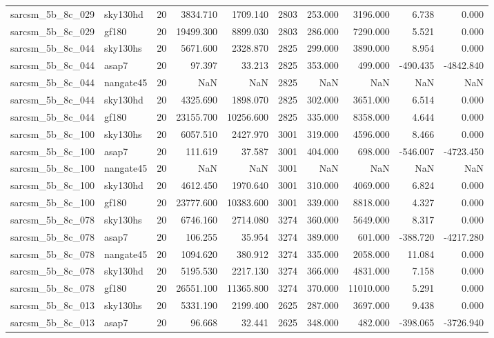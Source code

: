 \begin{longtable}{llrrrrrrrr}
sarcsm\_5b\_8c\_029 & sky130hd & 20 & 3834.710 & 1709.140 & 2803 & 253.000 & 3196.000 & 6.738 & 0.000 \\
sarcsm\_5b\_8c\_029 & gf180 & 20 & 19499.300 & 8899.030 & 2803 & 286.000 & 7290.000 & 5.521 & 0.000 \\
sarcsm\_5b\_8c\_044 & sky130hs & 20 & 5671.600 & 2328.870 & 2825 & 299.000 & 3890.000 & 8.954 & 0.000 \\
sarcsm\_5b\_8c\_044 & asap7 & 20 & 97.397 & 33.213 & 2825 & 353.000 & 499.000 & -490.435 & -4842.840 \\
sarcsm\_5b\_8c\_044 & nangate45 & 20 & NaN & NaN & 2825 & NaN & NaN & NaN & NaN \\
sarcsm\_5b\_8c\_044 & sky130hd & 20 & 4325.690 & 1898.070 & 2825 & 302.000 & 3651.000 & 6.514 & 0.000 \\
sarcsm\_5b\_8c\_044 & gf180 & 20 & 23155.700 & 10256.600 & 2825 & 335.000 & 8358.000 & 4.644 & 0.000 \\
sarcsm\_5b\_8c\_100 & sky130hs & 20 & 6057.510 & 2427.970 & 3001 & 319.000 & 4596.000 & 8.466 & 0.000 \\
sarcsm\_5b\_8c\_100 & asap7 & 20 & 111.619 & 37.587 & 3001 & 404.000 & 698.000 & -546.007 & -4723.450 \\
sarcsm\_5b\_8c\_100 & nangate45 & 20 & NaN & NaN & 3001 & NaN & NaN & NaN & NaN \\
sarcsm\_5b\_8c\_100 & sky130hd & 20 & 4612.450 & 1970.640 & 3001 & 310.000 & 4069.000 & 6.824 & 0.000 \\
sarcsm\_5b\_8c\_100 & gf180 & 20 & 23777.600 & 10383.600 & 3001 & 339.000 & 8818.000 & 4.327 & 0.000 \\
sarcsm\_5b\_8c\_078 & sky130hs & 20 & 6746.160 & 2714.080 & 3274 & 360.000 & 5649.000 & 8.317 & 0.000 \\
sarcsm\_5b\_8c\_078 & asap7 & 20 & 106.255 & 35.954 & 3274 & 389.000 & 601.000 & -388.720 & -4217.280 \\
sarcsm\_5b\_8c\_078 & nangate45 & 20 & 1094.620 & 380.912 & 3274 & 335.000 & 2058.000 & 11.084 & 0.000 \\
sarcsm\_5b\_8c\_078 & sky130hd & 20 & 5195.530 & 2217.130 & 3274 & 366.000 & 4831.000 & 7.158 & 0.000 \\
sarcsm\_5b\_8c\_078 & gf180 & 20 & 26551.100 & 11365.800 & 3274 & 370.000 & 11010.000 & 5.291 & 0.000 \\
sarcsm\_5b\_8c\_013 & sky130hs & 20 & 5331.190 & 2199.400 & 2625 & 287.000 & 3697.000 & 9.438 & 0.000 \\
sarcsm\_5b\_8c\_013 & asap7 & 20 & 96.668 & 32.441 & 2625 & 348.000 & 482.000 & -398.065 & -3726.940 \\

\end{longtable}
